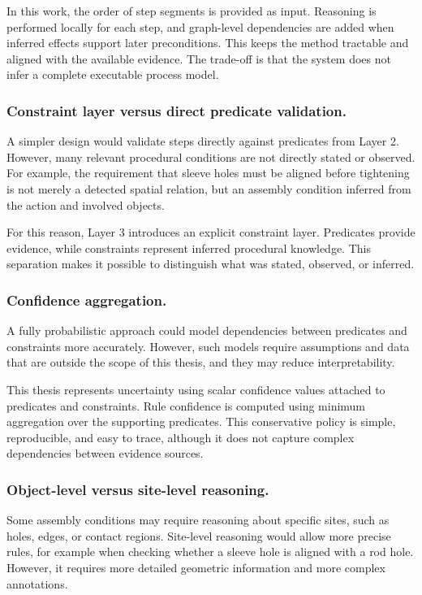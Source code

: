 In this work, the order of step segments is provided as input. Reasoning is performed locally for each step, and graph-level dependencies are added when inferred effects support later preconditions. This keeps the method tractable and aligned with the available evidence. The trade-off is that the system does not infer a complete executable process model.

\subsubsection{Constraint layer versus direct predicate validation.}
A simpler design would validate steps directly against predicates from Layer 2. However, many relevant procedural conditions are not directly stated or observed. For example, the requirement that sleeve holes must be aligned before tightening is not merely a detected spatial relation, but an assembly condition inferred from the action and involved objects.

For this reason, Layer 3 introduces an explicit constraint layer. Predicates provide evidence, while constraints represent inferred procedural knowledge. This separation makes it possible to distinguish what was stated, observed, or inferred.

\subsubsection{Confidence aggregation.}
A fully probabilistic approach could model dependencies between predicates and constraints more accurately. However, such models require assumptions and data that are outside the scope of this thesis, and they may reduce interpretability.

This thesis represents uncertainty using scalar confidence values attached to predicates and constraints. Rule confidence is computed using minimum aggregation over the supporting predicates. This conservative policy is simple, reproducible, and easy to trace, although it does not capture complex dependencies between evidence sources.

\subsubsection{Object-level versus site-level reasoning.}
Some assembly conditions may require reasoning about specific sites, such as holes, edges, or contact regions. Site-level reasoning would allow more precise rules, for example when checking whether a sleeve hole is aligned with a rod hole. However, it requires more detailed geometric information and more complex annotations.

